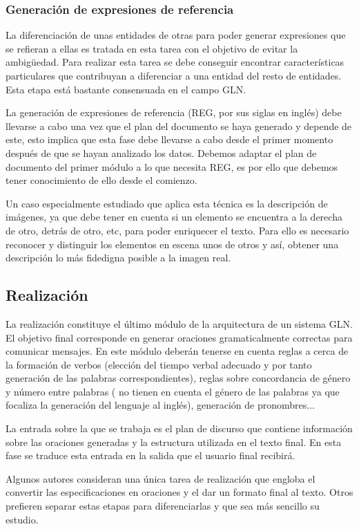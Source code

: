 \subsubsection{Generación de expresiones de referencia}
La diferenciación de unas entidades de otras para poder generar expresiones que se refieran a ellas es tratada en esta tarea con el objetivo de evitar la ambigüedad. Para realizar esta tarea se debe conseguir encontrar características particulares que contribuyan a diferenciar a una entidad del resto de entidades. Esta etapa está bastante consensuada en el campo GLN. 

La generación de expresiones de referencia (REG, por sus siglas en inglés) debe llevarse a cabo una vez que el plan del documento se haya generado y depende de este, esto implica que esta fase debe llevarse a cabo desde el primer momento después de que se hayan analizado los datos. Debemos adaptar el plan de documento del primer módulo a lo que necesita REG, es por ello que debemos tener conocimiento de ello desde el comienzo.

Un caso especialmente estudiado que aplica esta técnica es la descripción de imágenes, ya que debe tener en cuenta si un elemento se encuentra a la derecha de otro, detrás de otro, etc, para poder enriquecer el texto. Para ello es necesario reconocer y distinguir los elementos en escena unos de otros y así, obtener una descripción lo más fidedigna posible a la imagen real.

\subsection{Realización}
La realización constituye el último módulo de la arquitectura de un sistema GLN. El objetivo final corresponde en generar oraciones gramaticalmente correctas para comunicar mensajes. En este módulo deberán tenerse en cuenta reglas a cerca de la formación de verbos (elección del tiempo verbal adecuado y por tanto generación de las palabras correspondientes), reglas sobre concordancia de género y número entre palabras (\cite{reiter1997building} no tienen en cuenta el género de las palabras ya que focaliza la generación del lenguaje al inglés), generación de pronombres...

La entrada sobre la que se trabaja es el plan de discurso que contiene información sobre las oraciones generadas y la estructura utilizada en el texto final. En esta fase se traduce esta entrada en la salida que el usuario final recibirá.

Algunos autores consideran una única tarea de realización que engloba el convertir las especificaciones en oraciones y el dar un formato final al texto. Otros prefieren separar estas etapas para diferenciarlas y que sea más sencillo su estudio.

